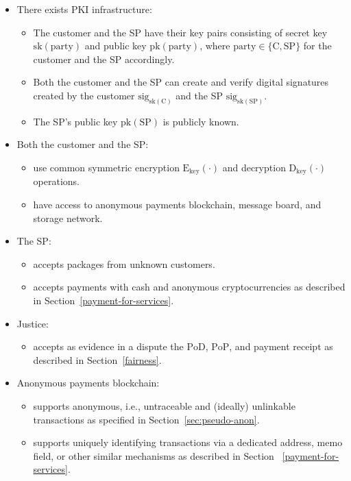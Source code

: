 \begin{itemize}
\item There exists PKI infrastructure:
    \begin{itemize}
        \item The customer and the SP have their key pairs consisting of secret key $\mathrm{sk}(\mathrm{party})$ and public key $\mathrm{pk}(\mathrm{party})$, where $\mathrm{party} \in \{\mathrm{C}, \mathrm{SP}\}$ for the customer and the SP accordingly.
        \item Both the customer and the SP can create and verify digital signatures created by the customer $\mathrm{sig}_{\mathrm{sk}(\mathrm{C})}$ and the SP $\mathrm{sig}_{\mathrm{sk}(\mathrm{SP})}$.
        \item The SP's public key $\mathrm{pk}(\mathrm{SP})$ is publicly known.
    \end{itemize}
    
\item Both the customer and the SP:
    \begin{itemize}
        \item use common symmetric encryption $\mathrm{E}_\mathrm{key}(\cdot)$ and decryption $\mathrm{D}_\mathrm{key}(\cdot)$ operations.
        \item have access to anonymous payments blockchain, message board, and storage network.
    \end{itemize}

\item The SP:
    \begin{itemize}
        \item accepts packages from unknown customers.
        \item accepts payments with cash and anonymous cryptocurrencies as described in Section~\ref{payment-for-services}.
    \end{itemize}
    
\item Justice:
    \begin{itemize}
        \item accepts as evidence in a dispute the $\mathrm{PoD}$, $\mathrm{PoP}$, and payment $\mathrm{receipt}$ as described in Section~\ref{fairness}.
    \end{itemize}

\item Anonymous payments blockchain:
    \begin{itemize}
        \item supports anonymous, i.e., untraceable and (ideally) unlinkable transactions as specified in Section~\ref{sec:pseudo-anon}.
        \item supports uniquely identifying transactions via a dedicated address, memo field, or other similar mechanisms as described in Section ~\ref{payment-for-services}. 
    \end{itemize}


\end{itemize}
